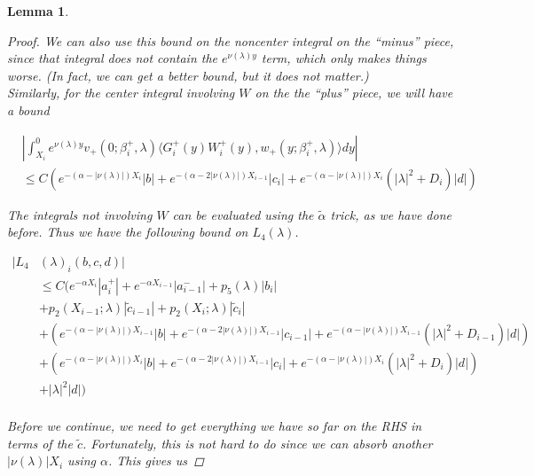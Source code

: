 \documentclass[12pt]{article}
\newtheorem{lemma}{Lemma}
\begin{document}
\begin{lemma}
\begin{proof}
We can also use this bound on the noncenter integral on the ``minus'' piece, since that integral does not contain the $e^{\nu(\lambda)y}$ term, which only makes things worse. (In fact, we can get a better bound, but it does not matter.)\\

Similarly, for the center integral involving $W$ on the the ``plus'' piece, we will have a bound

\begin{align*}
&\left| \int_{X_i}^0 e^{\nu(\lambda)y} v_+(0; \beta_i^+, \lambda) \langle G_i^+(y)W_i^+(y), w_+(y; \beta_i^+, \lambda) \rangle dy \right| \\
&\leq C ( e^{-(\alpha - |\nu(\lambda)|) X_i} |b| + e^{-(\alpha - 2 |\nu(\lambda)|) X_{i-1}}|c_i| + e^{-(\alpha - |\nu(\lambda)|) X_i} (|\lambda|^2 + D_i)|d| )
\end{align*}

The integrals not involving $W$ can be evaluated using the $\tilde{\alpha}$ trick, as we have done before. Thus we have the following bound on $L_4(\lambda)$. 

\begin{align*}
|L_4&(\lambda)_i(b, c, d)|\\ 
&\leq C \Big( e^{-\alpha X_i} |a_i^+| +  e^{-\alpha X_{i-1}} |a_{i-1}^-| + p_5(\lambda) |b_i| \\
&+ p_2(X_{i-1}; \lambda) |\tilde{c}_{i-1}| + p_2(X_i; \lambda) |\tilde{c}_i| \\
&+ ( e^{-(\alpha - |\nu(\lambda)|) X_{i-1}} |b| + e^{-(\alpha - 2 |\nu(\lambda)|) X_{i-1}}|c_{i-1}| + e^{-(\alpha - |\nu(\lambda)|) X_{i-1}} (|\lambda|^2 + D_{i-1})|d| ) \\
&+ ( e^{-(\alpha - |\nu(\lambda)|) X_i} |b| + e^{-(\alpha - 2 |\nu(\lambda)|) X_{i-1}}|c_i| + e^{-(\alpha - |\nu(\lambda)|) X_i} (|\lambda|^2 + D_i)|d| )  \\
&+ |\lambda|^2 |d| \Big)\\
\end{align*}

Before we continue, we need to get everything we have so far on the RHS in terms of the $\tilde{c}$. Fortunately, this is not hard to do since we can absorb another $|\nu(\lambda)|X_i$ using $\alpha$. This gives us


\end{proof}
\end{lemma}
\end{document}
